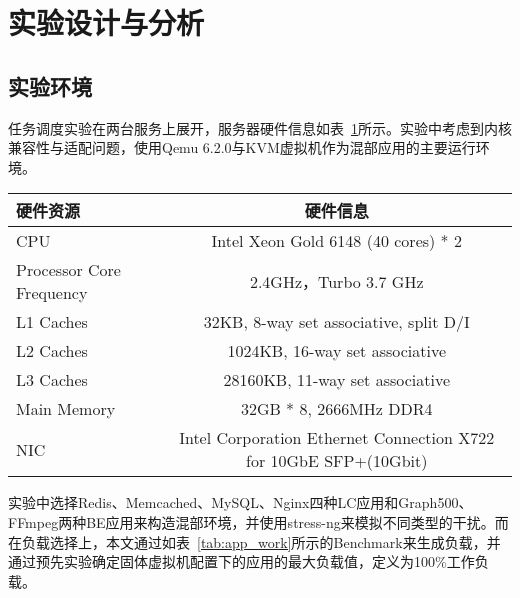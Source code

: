 
\section{实验设计与分析}

\subsection{实验环境}

任务调度实验在两台服务上展开，服务器硬件信息如表~\ref{tab:exp_env}所示。实验中考虑到内核兼容性与适配问题，使用Qemu 6.2.0与KVM虚拟机作为混部应用的主要运行环境。

\begin{table}[H]
    \label{tab:exp_env}
    \footnotesize%
    \setlength{\tabcolsep}{4pt}%
    \renewcommand{\arraystretch}{1.25}%
    \centering
    \begin{tabular}{lc}
        \hline
        硬件资源 & 硬件信息 \\
        \hline
        CPU & Intel Xeon Gold 6148 (40 cores) * 2 \\
        Processor Core Frequency & 2.4GHz，Turbo 3.7 GHz \\
        L1 Caches & 32KB,  8-way set associative, split D/I \\
        L2 Caches & 1024KB, 16-way set associative \\
        L3 Caches & 28160KB, 11-way set associative \\
        Main Memory & 32GB * 8, 2666MHz DDR4 \\
        NIC & Intel Corporation Ethernet Connection X722 for 10GbE SFP+(10Gbit) \\
        \hline
    \end{tabular}
\end{table}

实验中选择Redis、Memcached、MySQL、Nginx四种LC应用和Graph500、FFmpeg两种BE应用来构造混部环境，并使用stress-ng来模拟不同类型的干扰。而在负载选择上，本文通过如表~\ref{tab:app_work}所示的Benchmark来生成负载，并通过预先实验确定固体虚拟机配置下的应用的最大负载值，定义为100\%工作负载。

